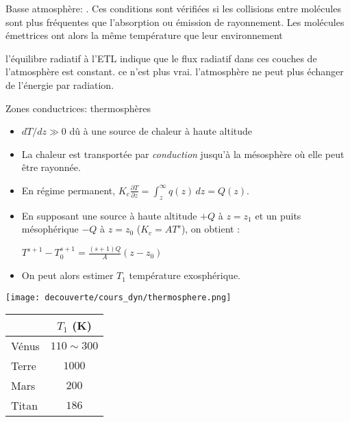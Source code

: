 
Basse atmosphère: . Ces conditions sont vérifiées 
si les collisions entre molécules 
sont plus fréquentes que 
l'absorption ou émission de rayonnement. 
Les molécules émettrices ont alors la même température que leur environnement

l'équilibre radiatif à l'ETL indique que le flux radiatif
dans ces couches de l'atmosphère est constant. ce n'est plus vrai.
l'atmosphère ne peut plus échanger de l'énergie par radiation.



Zones conductrices: thermosphères%
\begin{itemize}
\item $dT/dz \gg 0$ dû à une source de chaleur à haute altitude
\item La chaleur est transportée par \emph{conduction} jusqu'à la
  mésosphère où elle peut être rayonnée.
\item En régime permanent, $K_c \frac{\partial T}{\partial z} =
  \int_{z}^{\infty} q(z) \, dz = Q(z)$.
\item En supposant une source à haute altitude $+Q$ à $z=z_1$ et un
  puits mésophérique $-Q$ à $z=z_0$ ($K_c = A T^s$), on obtient :
\begin{center}
$T^{s+1} - T_0^{s+1} = \frac{(s+1)Q}{A} \left( z - z_0 \right)$
\end{center}
\item On peut alors estimer $T_1$ température exosphérique.
\end{itemize}
\texttt{[image: decouverte/cours\_dyn/thermosphere.png]}
\begin{tabular}{lc}
\hline
 & $T_1$ (K) \\
\hline
Vénus & $110\sim 300$\\
Terre & $1000$ \\
Mars & $200$ \\
Titan & $186$\\
\hline
\end{tabular}
